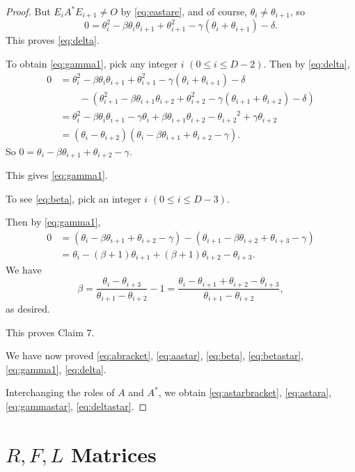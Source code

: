 \documentclass[
]{book}
\theoremstyle{definition}
\theoremstyle{definition}
\theoremstyle{definition}
\theoremstyle{definition}
\theoremstyle{remark}
\begin{document}
\begin{proof}
But \(E_iA^*E_{i+1} \neq O\) by \eqref{eq:eastare}, and of course, \(\theta_i\neq \theta_{i+1}\), so
\[0 = \theta^2_i-\beta\theta_i\theta_{i+1}+\theta_{i+1}^2-\gamma(\theta_i+\theta_{i+1})-\delta.\]
This proves \eqref{eq:delta}.

To obtain \eqref{eq:gamma1}, pick any integer \(i\) \((0\leq i\leq D-2)\).
Then by \eqref{eq:delta},
\begin{align}
0 & = \theta^2_i-\beta\theta_i\theta_{i+1}+\theta_{i+1}^2-\gamma(\theta_i+\theta_{i+1})-\delta\\
& \qquad -(\theta^2_{i+1}-\beta\theta_{i+1}\theta_{i+2}+\theta_{i+2}^2-\gamma(\theta_{i+1}+\theta_{i+2})-\delta)\\
& = \theta_i^2 - \beta\theta_i\theta_{i+1}-\gamma\theta_i + \beta\theta_{i+1}\theta_{i+2}-{\theta_{i+2}}^2 + \gamma\theta_{i+2}\\
& = (\theta_i-\theta_{i+2})(\theta_i - \beta\theta_{i+1} + \theta_{i+2} - \gamma).
\end{align}
So \(0 = \theta_i - \beta\theta_{i+1} + \theta_{i+2} - \gamma\).

This gives \eqref{eq:gamma1}.

To see \eqref{eq:beta}, pick an integer \(i\) \((0\leq i\leq D-3)\).

Then by \eqref{eq:gamma1},
\begin{align}
0 & = (\theta_i - \beta\theta_{i+1} + \theta_{i+2} - \gamma) - (\theta_{i+1} - \beta\theta_{i+2} + \theta_{i+3} - \gamma) \\
& = \theta_i-(\beta+1)\theta_{i+1} + (\beta+1)\theta_{i+2} - \theta_{i+3}.
\end{align}
We have
\[\beta = \frac{\theta_i-\theta_{i+3}}{\theta_{i+1}-\theta_{i+2}} - 1 = \frac{\theta_i-\theta_{i+1}+\theta_{i+2}-\theta_{i+3}}{\theta_{i+1}-\theta_{i+2}},\]
as desired.

This proves Claim 7.

We have now proved \eqref{eq:abracket}, \eqref{eq:aastar}, \eqref{eq:beta}, \eqref{eq:betastar}, \eqref{eq:gamma1}, \eqref{eq:delta}.

Interchanging the roles of \(A\) and \(A^*\), we obtain \eqref{eq:astarbracket}, \eqref{eq:astara}, \eqref{eq:gammastar}, \eqref{eq:deltastar}.

\end{proof}

\hypertarget{lec30}{%
\chapter{\texorpdfstring{\(R, F, L\) Matrices}{R, F, L Matrices}}\label{lec30}}
\end{document}
